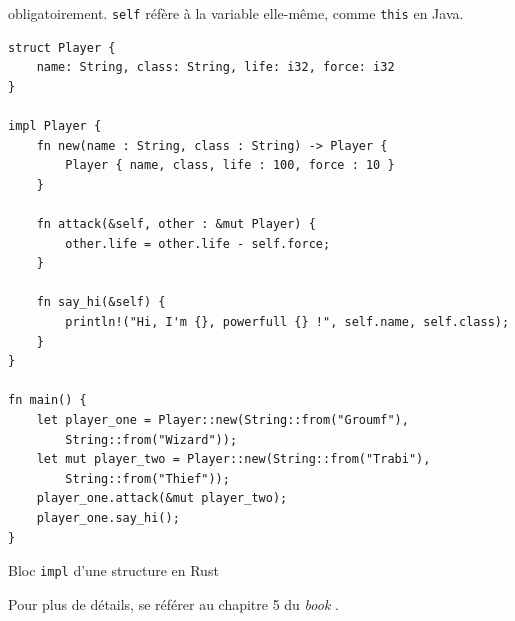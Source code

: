 \documentclass[a4paper, 12pt]{article}
\newenvironment{code}{\captionsetup{type=listing}}{}
\begin{document}
obligatoirement. \texttt{self} réfère à la variable elle-même, comme \texttt{this} 
en Java.
\bigbreak
\begin{code}
    \begin{verbatim}
struct Player {
    name: String, class: String, life: i32, force: i32
}

impl Player {
    fn new(name : String, class : String) -> Player {
        Player { name, class, life : 100, force : 10 }
    }

    fn attack(&self, other : &mut Player) {
        other.life = other.life - self.force;
    }

    fn say_hi(&self) {
        println!("Hi, I'm {}, powerfull {} !", self.name, self.class);
    }
}

fn main() {
    let player_one = Player::new(String::from("Groumf"),
        String::from("Wizard"));
    let mut player_two = Player::new(String::from("Trabi"),
        String::from("Thief"));
    player_one.attack(&mut player_two);
    player_one.say_hi();
}
    \end{verbatim}
    \caption{Bloc \texttt{impl} d'une structure en Rust}
    \label{rust_struct_impl}
\end{code}
\bigbreak
Pour plus de détails, se référer au chapitre 5 du \textit{book} \cite{ref0}.
\end{document}

